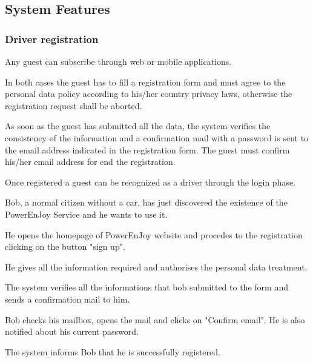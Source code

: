 \subsection{System Features}

\subsubsection{Driver registration}

Any guest can subscribe through web or mobile applications.

In both cases the guest has to fill a registration form and must agree to the personal data policy according to his/her country privacy laws, otherwise the registration request shall be aborted.

As soon as the guest has submitted all the data, the system verifies the consistency of the information and a confirmation mail with a password is sent to the email address indicated in the registration form. The guest 
must confirm his/her email address for end the registration.

Once registered a guest can be recognized as a driver through the login phase.

Bob, a normal citizen without a car, has just discovered the existence of the PowerEnJoy Service and he wants to use it.

He opens the homepage of PowerEnJoy website and procedes to the registration clicking on the button "sign up".

He gives all the information required and authorises the personal data treatment. 

The system verifies all the informations that bob submitted to the form and sends a confirmation mail to him.

Bob checks his mailbox, opens the mail and clicks on "Confirm email". He is also notified about his current password.

The system informs Bob that he is successfully registered.

